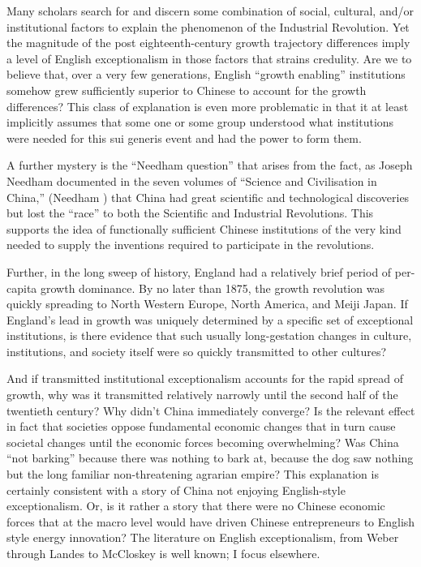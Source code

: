 \documentclass[12pt]{article}
\numberwithin{equation}{section}
\begin{document}
	Many scholars search for and discern some combination of social, cultural, and/or institutional factors to explain the phenomenon of the Industrial Revolution. Yet the magnitude of the post eighteenth-century growth trajectory differences imply a level of English exceptionalism in those factors that strains credulity. Are we to believe that, over a very few generations, English ``growth enabling'' institutions somehow grew sufficiently superior to Chinese to account for the growth differences? This class of explanation is even more problematic in that it at least implicitly assumes that some one or some group understood what institutions were needed for this sui generis event and had the power to form them.
	
	A further mystery is the ``Needham question'' that arises from the fact, as Joseph Needham documented in the seven volumes of ``Science and Civilisation in China,'' (Needham \citeyear{needham_science_1954}) that China had great scientific and technological discoveries but lost the ``race'' to both the Scientific and Industrial Revolutions. This supports the idea of functionally sufficient Chinese institutions of the very kind needed to supply the inventions required to participate in the revolutions.
	
	Further, in the long sweep of history, England had a relatively brief period of per-capita growth dominance. By no later than 1875, the growth revolution was quickly spreading to North Western Europe, North America, and Meiji Japan. If England's lead in growth was uniquely determined by a specific set of exceptional institutions, is there evidence that such usually long-gestation changes in culture, institutions, and society itself were so quickly transmitted to other cultures?
	
	And if transmitted institutional exceptionalism accounts for the rapid spread of growth, why was it transmitted relatively narrowly until the second half of the twentieth century? Why didn't China immediately converge? Is the relevant effect in fact that societies oppose fundamental economic changes that in turn cause societal changes until the economic forces becoming overwhelming? Was China ``not barking'' because there was nothing to bark at, because the dog saw nothing but the long familiar non-threatening agrarian empire? This explanation is certainly consistent with a story of China not enjoying English-style exceptionalism. Or, is it rather a story that there were no Chinese economic forces that at the macro level would have driven Chinese entrepreneurs to English style energy innovation? The literature on English exceptionalism, from Weber through Landes to McCloskey is well known; I focus elsewhere.
	
\end{document}
